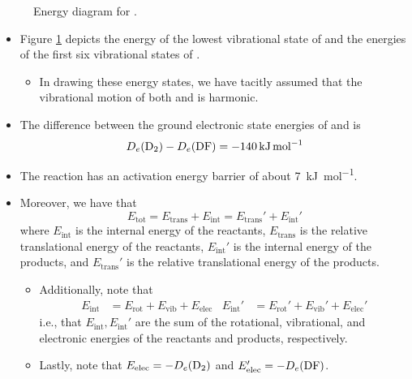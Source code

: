 \documentclass[../notes.tex]{subfiles}
\begin{document}
\begin{itemize}
\begin{figure}[h!]
        \caption{Energy diagram for .}
        \label{fig:FD2}
    \end{figure}
    \begin{itemize}
        \item Figure \ref{fig:FD2} depicts the energy of the lowest vibrational state of  and the energies of the first six vibrational states of .
        \begin{itemize}
            \item In drawing these energy states, we have tacitly assumed that the vibrational motion of both  and  is harmonic.
        \end{itemize}
        \item The difference between the ground electronic state energies of  and  is
        \begin{equation*}
            D_e(\ce{D2})-D_e(\ce{DF}) = -\SI{140}{\kilo\joule\per\mole}
        \end{equation*}
        \item The reaction has an activation energy barrier of about \SI{7}{\kilo\joule\per\mole}.
        \item Moreover, we have that
        \begin{equation*}
            E_\text{tot} = E_\text{trans}+E_\text{int}
            = E_\text{trans}'+E_\text{int}'
        \end{equation*}
        where $E_\text{int}$ is the internal energy of the reactants, $E_\text{trans}$ is the relative translational energy of the reactants, $E_\text{int}'$ is the internal energy of the products, and $E_\text{trans}'$ is the relative translational energy of the products.
        \begin{itemize}
            \item Additionally, note that
            \begin{align*}
                E_\text{int} &= E_\text{rot}+E_\text{vib}+E_\text{elec}&
                E_\text{int}' &= E_\text{rot}'+E_\text{vib}'+E_\text{elec}'
            \end{align*}
            i.e., that $E_\text{int},E_\text{int}'$ are the sum of the rotational, vibrational, and electronic energies of the reactants and products, respectively.
            \item Lastly, note that $E_\text{elec}=-D_e(\ce{D2})$ and $E_\text{elec}'=-D_e(\ce{DF})$.
        \end{itemize}
    \end{itemize}
\end{itemize}
\end{document}
